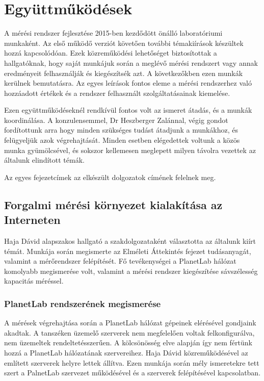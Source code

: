 \chapter{Együttműködések}

A mérési rendszer fejlesztése 2015-ben kezdődött önálló laboratóriumi munkaként. Az első működő verziót követően további témakiírások készültek hozzá kapcsolódóan. Ezek közreműködési lehetőséget biztosítottak a hallgatóknak, hogy saját munkájuk során a meglévő mérési rendszert vagy annak eredményeit felhasználják és kiegészítsék azt. A következőkben ezen munkák kerülnek bemutatásra. Az egyes leírások fontos eleme a mérési rendszerhez való hozzáadott értékek és a rendszer felhasznált szolgáltatásainak kiemelése.

Ezen együttműködéseknél rendkívül fontos volt az ismeret átadás, és a munkák koordinálása. A konzulensemmel, Dr Heszberger Zalánnal, végig gondot fordítottunk arra hogy minden szükséges tudást átadjunk a munkákhoz, és felügyeljük azok végrehajtását. Minden esetben elégedettek voltunk a közös munka gyümölcsével, és sokszor kellemesen meglepett milyen távolra vezettek az általunk elindított témák.

Az egyes fejezetcímek az elkészült dolgozatok címének felelnek meg.

\section{Forgalmi mérési környezet kialakítása az Interneten}


Haja Dávid alapszakos hallgató a szakdolgozataként választotta az általunk kiírt témát. Munkája során megismerte az Elméleti Áttekintés fejezet tudásanyagát, valamint a mérőrendszer felépítését. Fő tevékenységei a PlanetLab hálózat komolyabb megismerése volt, valamint a mérési rendszer kiegészítése sávszélesség kapacitás méréssel.

\subsection*{PlanetLab rendszerének megismerése}
A mérések végrehajtása során a PlanetLab hálózat gépeinek elérésével gondjaink akadtak. A tanszéken üzemelő szerverek nem megfelelően voltak felkonfigurálva, nem üzemeltek rendeltetésszerűen. A kölcsönösség elve alapján így nem fértünk hozzá a PlanetLab hálózatának szervereihez.
Haja Dávid közreműködésével az említett szerverek helyre lettek állítva. Ezen munkája során mély ismeretekre tett szert a PalnetLab szervezet működésével és a szerverek felépítésével kapcsolatban.

